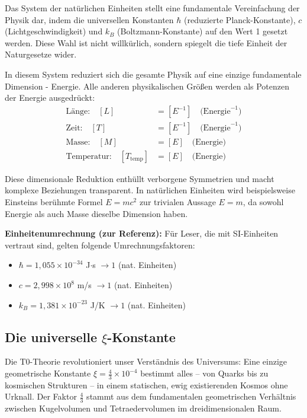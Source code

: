 \documentclass[12pt,a4paper]{article}
\theoremstyle{definition}
\theoremstyle{remark}
\begin{document}
	Das System der nat\"urlichen Einheiten stellt eine fundamentale Vereinfachung der Physik dar, indem die universellen Konstanten $\hbar$ (reduzierte Planck-Konstante), $c$ (Lichtgeschwindigkeit) und $k_B$ (Boltzmann-Konstante) auf den Wert 1 gesetzt werden. Diese Wahl ist nicht willk\"urlich, sondern spiegelt die tiefe Einheit der Naturgesetze wider.
	
	In diesem System reduziert sich die gesamte Physik auf eine einzige fundamentale Dimension - Energie. Alle anderen physikalischen Gr\"o\ss{}en werden als Potenzen der Energie ausgedr\"uckt:
	\begin{align}
		\text{L\"ange:} \quad [L] &= [E^{-1}] \quad \text{(Energie}^{-1}\text{)} \\
		\text{Zeit:} \quad [T] &= [E^{-1}] \quad \text{(Energie}^{-1}\text{)} \\
		\text{Masse:} \quad [M] &= [E] \quad \text{(Energie)} \\
		\text{Temperatur:} \quad [T_{\text{temp}}] &= [E] \quad \text{(Energie)}
	\end{align}
	
	Diese dimensionale Reduktion enth\"ullt verborgene Symmetrien und macht komplexe Beziehungen transparent. In nat\"urlichen Einheiten wird beispielsweise Einsteins ber\"uhmte Formel $E = mc^2$ zur trivialen Aussage $E = m$, da sowohl Energie als auch Masse dieselbe Dimension haben.
	
	\textbf{Einheitenumrechnung (zur Referenz):}
	F\"ur Leser, die mit SI-Einheiten vertraut sind, gelten folgende Umrechnungsfaktoren:
	\begin{itemize}
		\item $\hbar = 1{,}055 \times 10^{-34}$ J$\cdot$s $\rightarrow 1$ (nat. Einheiten)
		\item $c = 2{,}998 \times 10^8$ m/s $\rightarrow 1$ (nat. Einheiten)  
		\item $k_B = 1{,}381 \times 10^{-23}$ J/K $\rightarrow 1$ (nat. Einheiten)
	\end{itemize}
	
	\subsection{Die universelle $\xi$-Konstante}
	
	\begin{revolutionary}
		Die T0-Theorie revolutioniert unser Verst\"andnis des Universums: Eine einzige geometrische Konstante $\xi = \frac{4}{3} \times 10^{-4}$ bestimmt alles -- von Quarks bis zu kosmischen Strukturen -- in einem statischen, ewig existierenden Kosmos ohne Urknall. Der Faktor $\frac{4}{3}$ stammt aus dem fundamentalen geometrischen Verh\"altnis zwischen Kugelvolumen und Tetraedervolumen im dreidimensionalen Raum.
	\end{revolutionary}
	
\end{document}
